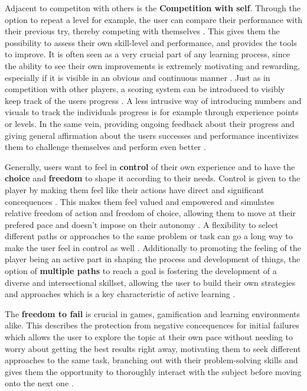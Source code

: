 Adjacent to competiton with others is the \textbf{Competition with self}. Through the option to repeat a level for example, the user can compare their performance with their previous try, thereby competing with themselves \cite{fail}. This gives them the possibility to assess their own skill-level and performance, and provides the tools to improve. It is often seen as a very crucial part of any learning process, since the ability to see their own improvements is extremely motivating and rewarding, especially if it is visible in an obvious and continuous manner \cite{lifelong}. Just as in competition with other players, a scoring system can be introduced to visibly keep track of the users progress \cite{lifelong}. A less intrusive way of introducing numbers and visuals to track the individuals progress is for example through experience points or levels.
In the same vein, providing ongoing feedback about their progress and giving general affirmation about the users successes and performance incentivizes them to challenge themselves and perform even better \cite{higher} \cite{engage}.

Generally, users want to feel in \textbf{control} of their own experience and to have the \textbf{choice} and \textbf{freedom} to shape it according to their needs. Control is given to the player by making them feel like their actions have direct and significant concequences \cite{aspects}. This makes them feel valued and empowered and simulates relative freedom of action and freedom of choice, allowing them to move at their prefered pace and doesn't impose on their autonomy \cite{engage} \cite{model}.
A flexibility to select different paths or approaches to the same problem or task can go a long way to make the user feel in control as well \cite{higher}.
Additionally to promoting the feeling of the player being an active part in shaping the process and development of things, the option of \textbf{multiple paths} to reach a goal is fostering the development of a diverse and intersectional skillset, allowing the user to build their own strategies and approaches which is a key characteristic of active learning \cite{edu}.

The \textbf{freedom to fail} is crucial in games, gamification and learning environments alike. This describes the protection from negative concequences for initial failures \cite{engage} which allows the user to explore the topic at their own pace without needing to worry about getting the best results right away, motivating them to seek different approaches to the same task, branching out with their problem-solving skills and gives them the opportunity to thoroughly interact with the subject before moving onto the next one \cite{lifelong}.

